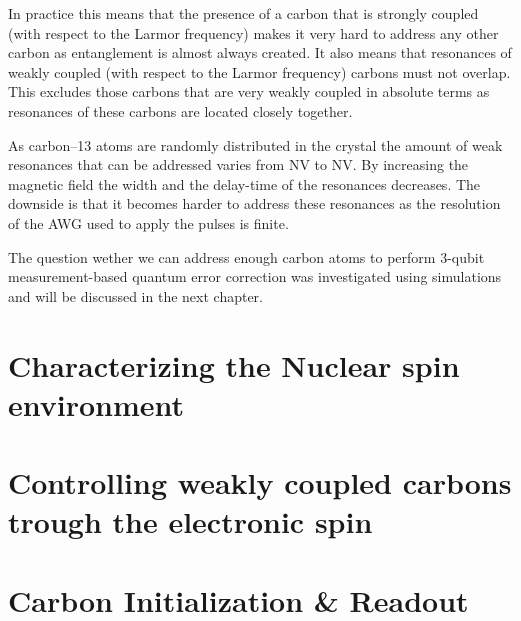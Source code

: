 In practice this means that the presence of a carbon that is strongly coupled (with respect to the Larmor frequency) makes it very hard to address any other carbon as entanglement is almost always created. It also means that resonances of weakly coupled (with respect to the Larmor frequency) carbons must not overlap. This excludes those carbons that are very weakly coupled in absolute terms as resonances of these carbons are located closely together.

As carbon--13 atoms are randomly distributed in the crystal the amount of weak resonances that can be addressed varies from NV to NV. By increasing the magnetic field the width and the delay-time of the resonances decreases. The downside is that it becomes harder to address these resonances as the resolution of the AWG used to apply the pulses is finite.

The question wether we can address enough carbon atoms to perform 3-qubit measurement-based quantum error correction was investigated using simulations and will be discussed in the next chapter.

\section{Characterizing the Nuclear spin environment}

\section{Controlling weakly coupled carbons trough the electronic spin}

\section{Carbon Initialization \& Readout}


